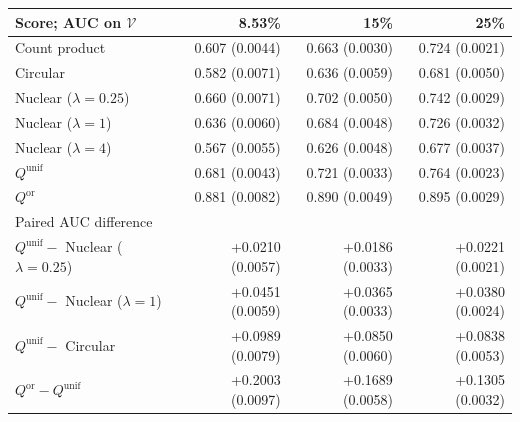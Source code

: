 \begin{tabular}{lrrr}
\toprule
Score; AUC on $\mathcal V$ & 8.53\% & 15\% & 25\% \\
\midrule
Count product & 0.607 (0.0044) & 0.663 (0.0030) & 0.724 (0.0021) \\
Circular & 0.582 (0.0071) & 0.636 (0.0059) & 0.681 (0.0050) \\
Nuclear ($\lambda=0.25$) & 0.660 (0.0071) & 0.702 (0.0050) & 0.742 (0.0029) \\
Nuclear ($\lambda=1$) & 0.636 (0.0060) & 0.684 (0.0048) & 0.726 (0.0032) \\
Nuclear ($\lambda=4$) & 0.567 (0.0055) & 0.626 (0.0048) & 0.677 (0.0037) \\
$Q^{\mathrm{unif}}$ & 0.681 (0.0043) & 0.721 (0.0033) & 0.764 (0.0023) \\
$Q^{\mathrm{or}}$ & 0.881 (0.0082) & 0.890 (0.0049) & 0.895 (0.0029) \\
\midrule
Paired AUC difference &  &  &  \\
\midrule
$Q^{\mathrm{unif}}-$ Nuclear ($\lambda=0.25$) & +0.0210 (0.0057) & +0.0186 (0.0033) & +0.0221 (0.0021) \\
$Q^{\mathrm{unif}}-$ Nuclear ($\lambda=1$) & +0.0451 (0.0059) & +0.0365 (0.0033) & +0.0380 (0.0024) \\
$Q^{\mathrm{unif}}-$ Circular & +0.0989 (0.0079) & +0.0850 (0.0060) & +0.0838 (0.0053) \\
$Q^{\mathrm{or}}-Q^{\mathrm{unif}}$ & +0.2003 (0.0097) & +0.1689 (0.0058) & +0.1305 (0.0032) \\
\bottomrule
\end{tabular}
